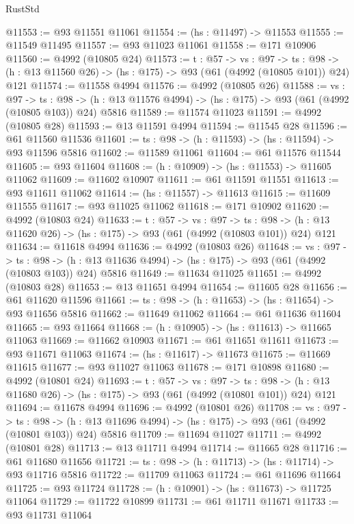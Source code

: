 \begin{lexlean}{RustStd}
\begin{coremodule}
@11553 := @93 @11551 @11061
@11554 := (hs : @11497) -> @11553
@11555 := @11549 @11495
@11557 := @93 @11023 @11061
@11558 := @171 @10906
@11560 := @4992 (@10805 @24)
@11573 := {t : @57} ->
  {vs : @97} ->
  {ts : @98} -> (h : @13 @11560 @26) -> (hs : @175) -> @93 (@61 (@4992 (@10805 @101)) @24) @121
@11574 := @11558 @4994
@11576 := @4992 (@10805 @26)
@11588 := {vs : @97} ->
  {ts : @98} -> (h : @13 @11576 @4994) -> (hs : @175) -> @93 (@61 (@4992 (@10805 @103)) @24) @5816
@11589 := @11574 @11023
@11591 := @4992 (@10805 @28)
@11593 := @13 @11591 @4994
@11594 := @11545 @28
@11596 := @61 @11560 @11536
@11601 := {ts : @98} -> (h : @11593) -> (hs : @11594) -> @93 @11596 @5816
@11602 := @11589 @11061
@11604 := @61 @11576 @11544
@11605 := @93 @11604
@11608 := (h : @10909) -> (hs : @11553) -> @11605 @11062
@11609 := @11602 @10907
@11611 := @61 @11591 @11551
@11613 := @93 @11611 @11062
@11614 := (hs : @11557) -> @11613
@11615 := @11609 @11555
@11617 := @93 @11025 @11062
@11618 := @171 @10902
@11620 := @4992 (@10803 @24)
@11633 := {t : @57} ->
  {vs : @97} ->
  {ts : @98} -> (h : @13 @11620 @26) -> (hs : @175) -> @93 (@61 (@4992 (@10803 @101)) @24) @121
@11634 := @11618 @4994
@11636 := @4992 (@10803 @26)
@11648 := {vs : @97} ->
  {ts : @98} -> (h : @13 @11636 @4994) -> (hs : @175) -> @93 (@61 (@4992 (@10803 @103)) @24) @5816
@11649 := @11634 @11025
@11651 := @4992 (@10803 @28)
@11653 := @13 @11651 @4994
@11654 := @11605 @28
@11656 := @61 @11620 @11596
@11661 := {ts : @98} -> (h : @11653) -> (hs : @11654) -> @93 @11656 @5816
@11662 := @11649 @11062
@11664 := @61 @11636 @11604
@11665 := @93 @11664
@11668 := (h : @10905) -> (hs : @11613) -> @11665 @11063
@11669 := @11662 @10903
@11671 := @61 @11651 @11611
@11673 := @93 @11671 @11063
@11674 := (hs : @11617) -> @11673
@11675 := @11669 @11615
@11677 := @93 @11027 @11063
@11678 := @171 @10898
@11680 := @4992 (@10801 @24)
@11693 := {t : @57} ->
  {vs : @97} ->
  {ts : @98} -> (h : @13 @11680 @26) -> (hs : @175) -> @93 (@61 (@4992 (@10801 @101)) @24) @121
@11694 := @11678 @4994
@11696 := @4992 (@10801 @26)
@11708 := {vs : @97} ->
  {ts : @98} -> (h : @13 @11696 @4994) -> (hs : @175) -> @93 (@61 (@4992 (@10801 @103)) @24) @5816
@11709 := @11694 @11027
@11711 := @4992 (@10801 @28)
@11713 := @13 @11711 @4994
@11714 := @11665 @28
@11716 := @61 @11680 @11656
@11721 := {ts : @98} -> (h : @11713) -> (hs : @11714) -> @93 @11716 @5816
@11722 := @11709 @11063
@11724 := @61 @11696 @11664
@11725 := @93 @11724
@11728 := (h : @10901) -> (hs : @11673) -> @11725 @11064
@11729 := @11722 @10899
@11731 := @61 @11711 @11671
@11733 := @93 @11731 @11064

\end{coremodule}
\end{lexlean}
